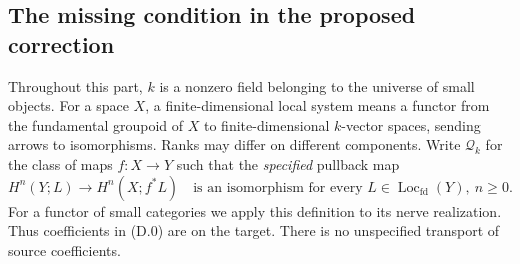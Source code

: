 \providecommand{\Perf}{\operatorname{Perf}}
\providecommand{\Fun}{\operatorname{Fun}}
\providecommand{\Locfd}{\operatorname{Loc}_{\mathrm{fd}}}
\providecommand{\alg}{\mathrm{alg}}
\providecommand{\sch}{\mathrm{sch}}
\providecommand{\Qfd}{\mathcal Q_k}
\providecommand{\Sfd}{\mathcal S_k}

\subsection{The missing condition in the proposed correction}

Throughout this part, $k$ is a nonzero field belonging to the universe
of small objects. For a space $X$, a finite-dimensional local system
means a functor from the fundamental groupoid of $X$ to finite-dimensional
$k$-vector spaces, sending arrows to isomorphisms. Ranks may differ on
different components. Write $\Qfd$ for the class of maps $f:X\to Y$ such
that the \emph{specified} pullback map
\[
 H^n(Y;L)\longrightarrow H^n(X;f^*L)
 \quad\text{is an isomorphism for every }L\in\Locfd(Y),\ n\geq0.
 \tag{D.0}
\]
For a functor of small categories we apply this definition to its nerve
realization. Thus coefficients in (D.0) are on the target. There is no
unspecified transport of source coefficients.

